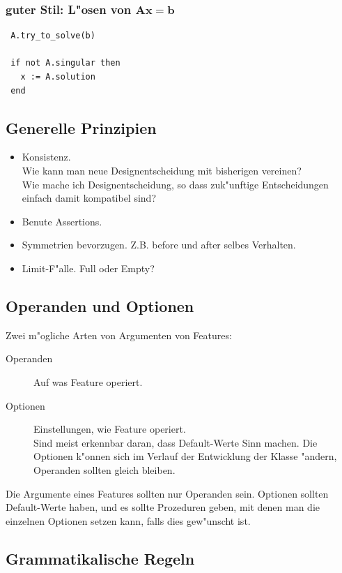 \documentclass[german, 10pt, a4paper, twocolumn]{scrartcl}
\theoremstyle{definition}
\begin{document}
\subsubsection{guter Stil: L"osen von $\mathbf{A}\mathbf{x} = \mathbf{b}$}

\begin{verbatim}
 A.try_to_solve(b)

 if not A.singular then
   x := A.solution
 end
\end{verbatim}

\subsection{Generelle Prinzipien}

\begin{itemize}
	\item Konsistenz.\\
		Wie kann man neue Designentscheidung mit bisherigen vereinen?\\
		Wie mache ich Designentscheidung, so dass zuk"unftige Entscheidungen einfach damit kompatibel sind?
	\item Benute Assertions.
	\item Symmetrien bevorzugen. Z.B. before und after selbes Verhalten.
	\item Limit-F"alle. Full oder Empty?
\end{itemize}

\subsection{Operanden und Optionen}

Zwei m"ogliche Arten von Argumenten von Features:
\begin{description}
	\item[Operanden] Auf was Feature operiert.
	\item[Optionen] Einstellungen, wie Feature operiert.\\
		Sind meist erkennbar daran, dass Default-Werte Sinn machen. Die Optionen k"onnen sich im Verlauf der Entwicklung der Klasse "andern, Operanden sollten gleich bleiben.
\end{description}

Die Argumente eines Features sollten nur Operanden sein. Optionen sollten Default-Werte haben, und es sollte Prozeduren geben, mit denen man die einzelnen Optionen setzen kann, falls dies gew"unscht ist.

\subsection{Grammatikalische Regeln}
\end{document}
